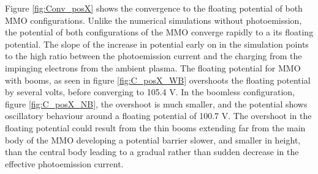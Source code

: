 Figure \ref{fig:Conv_posX} shows the convergence to the floating potential of both MMO configurations. Unlike the numerical simulations without photoemission, the potential of both configurations of the MMO converge rapidly to a its floating potential. The slope of the increase in potential early on in the simulation points to the high ratio between the photoemission current and the charging from the impinging electrons from the ambient plasma. The floating potential for MMO with booms, as seen in figure \ref{fig:C_posX_WB} overshoots the floating potential by several volts, before converging to 105.4 V. In the boomless configuration, figure \ref{fig:C_posX_NB}, the overshoot is much smaller, and the potential shows oscillatory behaviour around a floating potential of 100.7 V. The overshoot in the floating potential could result from the thin booms extending far from the main body of the MMO developing a potential barrier slower, and smaller in height, than the central body leading to a gradual rather than sudden decrease in the effective photoemission current.


